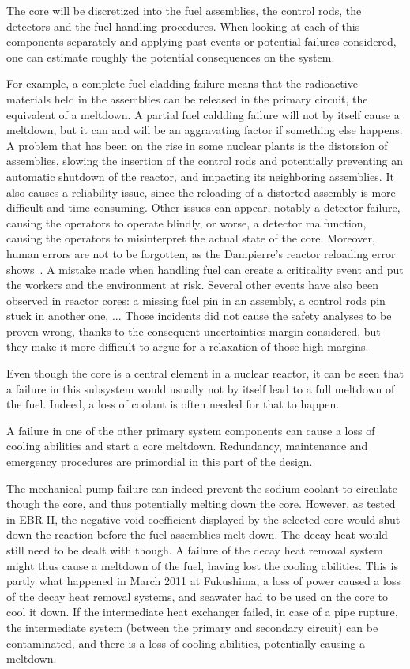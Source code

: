 The core will be discretized into the fuel assemblies, the control rods, the detectors and the fuel handling procedures. When looking at each of this components separately and applying past events or potential failures considered, one can estimate roughly the potential consequences on the system.

For example, a complete fuel cladding failure means that the radioactive materials held in the assemblies can be released in the primary circuit, the equivalent of a meltdown. A partial fuel caldding failure will not by itself cause a meltdown, but it can and will be an aggravating factor if something else happens. A problem that has been on the rise in some nuclear plants is the distorsion of assemblies, slowing the insertion of the control rods and potentially preventing an automatic shutdown of the reactor, and impacting its neighboring assemblies. It also causes a reliability issue, since the reloading of a distorted assembly is more difficult and time-consuming. Other issues can appear, notably a detector failure, causing the operators to operate blindly, or worse, a detector malfunction, causing the operators to misinterpret the actual state of the core. Moreover, human errors are not to be forgotten, as the Dampierre's reactor reloading error shows~\cite{verdier2005}. A mistake made when handling fuel can create a criticality event and put the workers and the environment at risk. Several other events have also been observed in reactor cores: a missing fuel pin in an assembly, a control rods pin stuck in another one, ... Those incidents did not cause the safety analyses to be proven wrong, thanks to the consequent uncertainties margin considered, but they make it more difficult to argue for a relaxation of those high margins.

Even though the core is a central element in a nuclear reactor, it can be seen that a failure in this subsystem would usually not by itself lead to a full meltdown of the fuel. Indeed, a loss of coolant is often needed for that to happen.

A failure in one of the other primary system components can cause a loss of cooling abilities and start a core meltdown. Redundancy, maintenance and emergency procedures are primordial in this part of the design.

The mechanical pump failure can indeed prevent the sodium coolant to circulate though the core, and thus potentially melting down the core. However, as tested in EBR-II, the negative void coefficient displayed by the selected core would shut down the reaction before the fuel assemblies melt down. The decay heat would still need to be dealt with though. A failure of the decay heat removal system might thus cause a meltdown of the fuel, having lost the cooling abilities. This is partly what happened in March 2011 at Fukushima, a loss of power caused a loss of the decay heat removal systems, and seawater had to be used on the core to cool it down.
If the intermediate heat exchanger failed, in case of a pipe rupture, the intermediate system (between the primary and secondary circuit) can be contaminated, and there is a loss of cooling abilities, potentially causing a meltdown.


